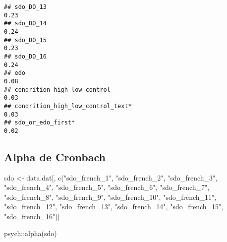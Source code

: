 \documentclass[
]{article}
\newenvironment{Shaded}{\begin{snugshade}}{\end{snugshade}}
\newcommand{\FunctionTok}[1]{\textcolor[rgb]{0.00,0.00,0.00}{#1}}
\newcommand{\NormalTok}[1]{#1}
\newcommand{\OtherTok}[1]{\textcolor[rgb]{0.56,0.35,0.01}{#1}}
\newcommand{\SpecialCharTok}[1]{\textcolor[rgb]{0.00,0.00,0.00}{#1}}
\newcommand{\StringTok}[1]{\textcolor[rgb]{0.31,0.60,0.02}{#1}}
\begin{document}
\begin{verbatim}
## sdo_DO_13                                                                                                                                                                                                                    0.23
## sdo_DO_14                                                                                                                                                                                                                    0.24
## sdo_DO_15                                                                                                                                                                                                                    0.23
## sdo_DO_16                                                                                                                                                                                                                    0.24
## edo                                                                                                                                                                                                                          0.08
## condrition_high_low_control                                                                                                                                                                                                  0.03
## condrition_high_low_control_text*                                                                                                                                                                                            0.03
## sdo_or_edo_first*                                                                                                                                                                                                            0.02
\end{verbatim}

\hypertarget{alpha-de-cronbach}{%
\subsection{Alpha de Cronbach}\label{alpha-de-cronbach}}

\begin{Shaded}
\begin{Highlighting}[]
\NormalTok{sdo }\OtherTok{\textless{}{-}}\NormalTok{ data.dat[, }\FunctionTok{c}\NormalTok{(}\StringTok{"sdo\_french\_1"}\NormalTok{, }\StringTok{"sdo\_french\_2"}\NormalTok{, }\StringTok{"sdo\_french\_3"}\NormalTok{, }\StringTok{"sdo\_french\_4"}\NormalTok{, }\StringTok{"sdo\_french\_5"}\NormalTok{, }\StringTok{"sdo\_french\_6"}\NormalTok{, }\StringTok{"sdo\_french\_7"}\NormalTok{, }\StringTok{"sdo\_french\_8"}\NormalTok{, }\StringTok{"sdo\_french\_9"}\NormalTok{, }\StringTok{"sdo\_french\_10"}\NormalTok{, }\StringTok{"sdo\_french\_11"}\NormalTok{, }\StringTok{"sdo\_french\_12"}\NormalTok{, }\StringTok{"sdo\_french\_13"}\NormalTok{, }\StringTok{"sdo\_french\_14"}\NormalTok{, }\StringTok{"sdo\_french\_15"}\NormalTok{, }\StringTok{"sdo\_french\_16"}\NormalTok{)]}

\NormalTok{psych}\SpecialCharTok{::}\FunctionTok{alpha}\NormalTok{(sdo)}
\end{Highlighting}
\end{Shaded}
\end{document}

